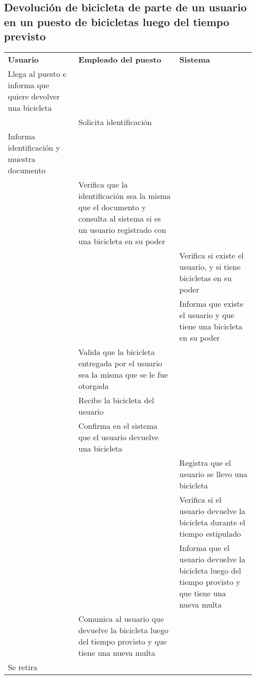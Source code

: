 \documentclass[a4paper, 11pt, spanish]{article}
\begin{document}
\endgroup

\subsection{Devolución de bicicleta de parte de un usuario en un puesto de bicicletas luego del tiempo previsto}

\begingroup
    \fontsize{8pt}{12pt}\selectfont

\begin{tabular}{|p{5cm}|p{5cm}|p{5cm}|}
\cline{1-3}
\textbf{Usuario} & \textbf{Empleado del puesto} & \textbf{Sistema} \\ \cline{1-3}
Llega al puesto e informa que quiere devolver una bicicleta & &\\ \cline{1-3}
 & Solicita identificación &    \\ \cline{1-3}
Informa identificación y muestra documento & & \\ \cline{1-3}
 & Verifica que la identificación sea la misma que el documento y consulta al sistema si es un usuario registrado con una bicicleta en su poder & \\ \cline{1-3}
 & & Verifica si existe el usuario, y si tiene bicicletas en su poder \\ \cline{1-3}
 & & Informa que existe el usuario y que tiene una bicicleta en su poder \\ \cline{1-3}
 & Valida que la bicicleta entregada por el usuario sea la misma que se le fue otorgada & \\ \cline{1-3}
 & Recibe la bicicleta del usuario & \\ \cline{1-3}
 & Confirma en el sistema que el usuario devuelve una bicicleta & \\ \cline{1-3}
 & & Registra que el usuario se llevo una bicicleta \\ \cline{1-3}
 & & Verifica si el usuario devuelve la bicicleta durante el tiempo estipulado \\ \cline{1-3}
 & & Informa que el usuario devuelve la bicicleta luego del tiempo provisto y que tiene una nueva multa\\ \cline{1-3}
 & Comunica al usuario que devuelve la bicicleta luego del tiempo provisto y que tiene una nueva multa & \\ \cline{1-3}
Se retira & & \\ \cline{1-3}
\end{tabular}

\endgroup

\vspace*{1cm}
\end{document}
